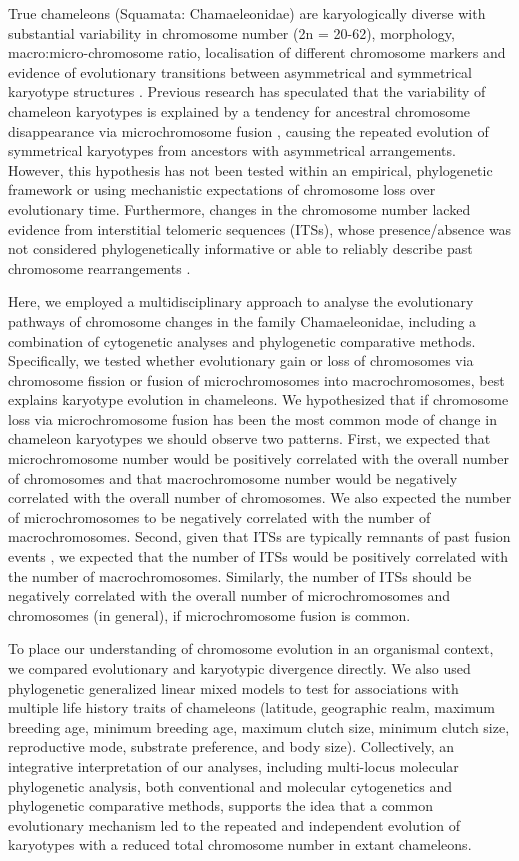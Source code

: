 \documentclass[a4paper, 12pt]{article}
\begin{document}
True chameleons (Squamata: Chamaeleonidae) are karyologically diverse with substantial variability in chromosome number (2n = 20-62), morphology, macro:micro-chromosome ratio, localisation of different chromosome markers and evidence of evolutionary transitions between asymmetrical and symmetrical karyotype structures \citep{rovatsos2017evolution,nielsen2018dynamic}.
Previous research has speculated that the variability of chameleon karyotypes is explained by a tendency for ancestral chromosome disappearance via microchromosome fusion \citep{rovatsos2017evolution}, causing the repeated evolution of symmetrical karyotypes from ancestors with asymmetrical arrangements. 
However, this hypothesis has not been tested within an empirical, phylogenetic framework or using mechanistic expectations of chromosome loss over evolutionary time. 
Furthermore, changes in the chromosome number lacked evidence from interstitial telomeric sequences (ITSs), whose presence/absence was not considered phylogenetically informative or able to reliably describe past chromosome rearrangements \citep{rovatsos2017evolution}.

Here, we employed a multidisciplinary approach to analyse the evolutionary pathways of chromosome changes in the family Chamaeleonidae, including a combination of cytogenetic analyses and phylogenetic comparative methods. 
Specifically, we tested whether evolutionary gain or loss of chromosomes via chromosome fission or fusion of microchromosomes into macrochromosomes, best explains karyotype evolution in chameleons. 
We hypothesized that if chromosome loss via microchromosome fusion has been the most common mode of change in chameleon karyotypes we should observe two patterns. 
First, we expected that microchromosome number would be positively correlated with the overall number of chromosomes and that macrochromosome number would be negatively correlated with the overall number of chromosomes. 
We also expected the number of microchromosomes to be negatively correlated with the number of macrochromosomes. 
Second, given that ITSs are typically remnants of past fusion events \citep{bolzan2017interstitial}, we expected that the number of ITSs would be positively correlated with the number of macrochromosomes. 
Similarly, the number of ITSs should be negatively correlated with the overall number of microchromosomes and chromosomes (in general), if microchromosome fusion is common. 

To place our understanding of chromosome evolution in an organismal context, we compared evolutionary and karyotypic divergence directly. 
We also used phylogenetic generalized linear mixed models to test for associations with multiple life history traits of chameleons (latitude, geographic realm, maximum breeding age, minimum breeding age, maximum clutch size, minimum clutch size, reproductive mode, substrate preference, and body size). 
Collectively, an integrative interpretation of our analyses, including multi-locus molecular phylogenetic analysis, both conventional and molecular cytogenetics and phylogenetic comparative methods, supports the idea that a common evolutionary mechanism led to the repeated and independent evolution of karyotypes with a reduced total chromosome number in extant chameleons.
\end{document}
